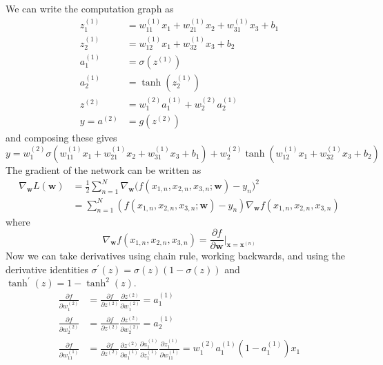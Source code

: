   \begin{solution}
    We can write the computation graph as 
    \begin{align} 
      z_1^{(1)} & = w_{11}^{(1)} x_1 + w_{21}^{(1)} x_2 + w_{31}^{(1)} x_3 + b_1 \\
      z_2^{(1)} & = w_{12}^{(1)} x_1 + w_{32}^{(1)} x_3 + b_2 \\
      a_1^{(1)} & = \sigma(z^{(1)})\\
      a_2^{(1)} & = \tanh(z_2^{(1)}) \\
      z^{(2)} & = w_{1}^{(2)} a_1^{(1)} + w_2^{(2)} a_2^{(1)} \\
      y = a^{(2)} & = g(z^{(2)})
    \end{align}
    and composing these gives 
    \begin{equation}
      y = w_1^{(2)} \sigma(w_{11}^{(1)} x_1  + w_{21}^{(1)} x_2 + w_{31}^{(1)} x_3 + b_1) + w_2^{(2)} \tanh(w_{12}^{(1)} x_1 + w_{32}^{(1)} x_3 + b_2)
    \end{equation}
    The gradient of the network can be written as 
    \begin{align}
      \nabla_\mathbf{w} L(\mathbf{w}) & = \frac{1}{2} \sum_{n=1}^N \nabla_\mathbf{w} \big( f(x_{1, n}, x_{2, n}, x_{3, n}; \mathbf{w}) - y_n \big)^2 \\
      & = \sum_{n=1}^N (f(x_{1, n}, x_{2, n}, x_{3, n}; \mathbf{w}) - y_n) \nabla_\mathbf{w} f(x_{1, n}, x_{2, n}, x_{3, n})
    \end{align}
    where 
    \begin{equation}
      \nabla_\mathbf{w} f(x_{1, n}, x_{2, n}, x_{3, n}) = \frac{\partial f}{\partial \mathbf{w}} \bigg|_{\mathbf{x} = \mathbf{x}^{(n)}}
    \end{equation}
    Now we can take derivatives using chain rule, working backwards, and using the derivative identities $\sigma^\prime (z)  = \sigma(z) (1 - \sigma(z))$ and $\tanh^\prime (z) = 1 - \tanh^2 (z)$. 
    \begin{align}
        \frac{\partial f}{\partial w_1^{(2)}} & = \frac{\partial f}{\partial z^{(2)}} \frac{\partial z^{(2)}}{\partial w_1^{(2)}} = a_1^{(1)} \\
        \frac{\partial f}{\partial w_2^{(2)}} & = \frac{\partial f}{\partial z^{(2)}} \frac{\partial z^{(2)}}{\partial w_2^{(2)}} = a_2^{(1)} \\ 
        \frac{\partial f}{\partial w_{11}^{(1)}} & = \frac{\partial f}{\partial z^{(2)}} \frac{\partial z^{(2)}}{\partial a^{(1)}_1} \frac{\partial a^{(1)}_1}{\partial z_1^{(1)}} \frac{\partial z_1^{(1)}}{\partial w_{11}^{(1)}} = w_1^{(2)} a_1^{(1)} (1 - a_1^{(1)}) x_1\\

\end{align}
\end{solution}
